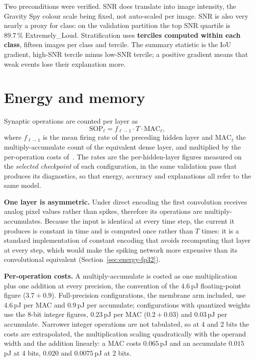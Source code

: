 Two preconditions were verified. SNR does translate into image intensity, the
Gravity Spy colour scale being fixed, not auto-scaled per image. SNR is
also very nearly a proxy for class: on the validation partition the top SNR
quartile is $89.7\,\%$ Extremely\_Loud. Stratification uses \textbf{terciles
computed within each class}, fifteen images per class and tercile. The summary
statistic is the IoU gradient, high-SNR tercile minus low-SNR tercile; a
positive gradient means that weak events lose their explanation more.

\section{Energy and memory}
\label{sec:energy-method}

Synaptic operations are counted per layer as
\begin{equation}
\mathrm{SOP}_{\ell} = f_{\ell-1} \cdot T \cdot \mathrm{MAC}_{\ell},
\end{equation}
where $f_{\ell-1}$ is the mean firing rate of the preceding hidden layer and
$\mathrm{MAC}_{\ell}$ the multiply-accumulate count of the equivalent dense
layer, and multiplied by the per-operation costs of~\cite{horowitz2014}. The
rates are the per-hidden-layer figures measured on the \emph{selected checkpoint}
of each configuration, in the same validation pass that produces its
diagnostics, so that energy, accuracy and explanations all refer to the same
model.

\textbf{One layer is asymmetric.} Under direct encoding the first convolution
receives analog pixel values rather than spikes, therefore its operations are
multiply-accumulates. Because the input is identical at every time step, the
current it produces is constant in time and is computed once rather than $T$
times: it is a standard implementation of constant encoding that avoids recomputing 
that layer at every step, which would make the spiking network
more expensive than its convolutional equivalent (Section~\ref{sec:energy-fp32}).

\textbf{Per-operation costs.} A multiply-accumulate is costed as one
multiplication plus one addition at every precision, the convention of the
$4.6$\,pJ floating-point figure ($3.7 + 0.9$). Full-precision configurations,
the membrane arm included, use $4.6$\,pJ per MAC and $0.9$\,pJ per accumulate;
configurations with quantized weights use the 8-bit integer figures, $0.23$\,pJ
per MAC ($0.2 + 0.03$) and $0.03$\,pJ per accumulate. Narrower integer
operations are not tabulated, so at 4 and 2 bits the costs are extrapolated,
the multiplication scaling quadratically with the operand width and the addition
linearly: a MAC costs $0.065$\,pJ and an accumulate $0.015$\,pJ at 4 bits,
$0.020$ and $0.0075$\,pJ at 2 bits.

